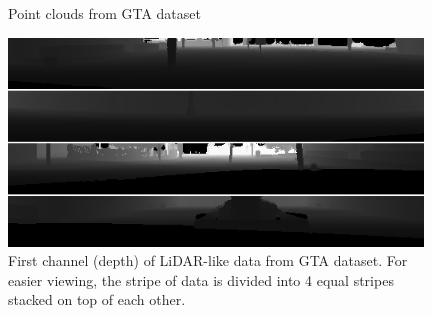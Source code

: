 \begin{figure}
\centering
{}
\hfil
{}
\caption{Point clouds from GTA dataset}
\end{figure}

\begin{figure}[H]
\centering
\includegraphics[width=0.98\textwidth,keepaspectratio]{img/gtalidardepth.png}
\caption[First channel of LiDAR-like data from GTA dataset]{First channel (depth) of LiDAR-like data from GTA dataset. For easier viewing, the stripe of data is divided into 4 equal stripes stacked on top of each other.}
\label{gtalidardepth}
\end{figure}

